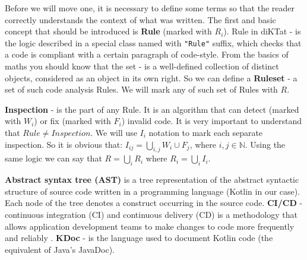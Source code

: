 Before we will move one, it is necessary to define some terms so that the reader correctly understands the context of what was written. 
The first and basic concept that should be introduced is \textbf{Rule} (marked with $R_i$). Rule in diKTat - is the logic described in a special class named with \texttt{"Rule"} suffix, which checks that a code is compliant with a certain paragraph of code-style. From the basics of maths you should know that the set - is a well-defined collection of distinct objects, considered as an object in its own right. So we can define a \textbf{Ruleset} - a set of such code analysis Rules. We will mark any of such set of Rules with $R$.

\textbf{Inspection} - is the part of any Rule. It is an algorithm that can detect (marked with $W_i$) or fix (marked with $F_i$) invalid code. It is very important to understand that $Rule \neq Inspection$. We will use $I_i$ notation to mark each separate inspection. So it is obvious that: $I_{ij} = \bigcup\limits_{i, j} W_{i} \cup F_{j}$, where $i, j \in \mathbb {N}$. Using the same logic we can say that $R = \bigcup\limits_{i} R_i$ where $R_i = \bigcup\limits_{i} I_i$.

\textbf{Abstract syntax tree (AST)} is a tree representation of the abstract syntactic structure of source code written in a programming language (Kotlin in our case). Each node of the tree denotes a construct occurring in the source code. \textbf{CI/CD} - continuous integration (CI) and continuous delivery (CD) is a methodology that allows application development teams to make changes to code more frequently and reliably \cite{ref:cicd}. \textbf{KDoc} - is the language used to document Kotlin code (the equivalent of Java's JavaDoc).